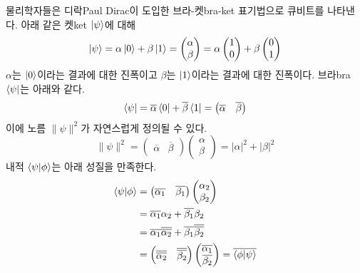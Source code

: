 \documentclass[a4paper,chapter,atbegshi]{oblivoir}
\begin{document}
물리학자들은 디락{\tiny Paul Dirac}이 도입한 브라-켓{\tiny bra-ket} 표기법으로
큐비트를 나타낸다. 아래 같은 켓{\tiny ket} $\ket{\psi}$에 대해
 \[
   \ket{\psi} = \alpha\ket0+\beta\ket1 = \begin{pmatrix}\alpha\\\beta\end{pmatrix}
  =\alpha\begin{pmatrix}1\\0\end{pmatrix}+\beta\begin{pmatrix}0\\1\end{pmatrix} 
 \]
$\alpha$는 $\ket{0}$이라는 결과에 대한 진폭이고 $\beta$는 $\ket{1}$이라는
결과에 대한 진폭이다. 브라{\tiny bra} $\bra{\psi}$는 아래와 같다.
 \[
   \bra{\psi} = \overline{\alpha}\bra0 +\overline{\beta}\bra1=
   \begin{pmatrix}\overline{\alpha}&\overline{\beta}\end{pmatrix}
 \]
 이에 노름 $\|\psi\|^2$가 자연스럽게 정의될 수 있다. 
 \[
   \|\psi\|^2 = \begin{pmatrix}\overline{\alpha}&\overline{\beta}\end{pmatrix}
   \begin{pmatrix}\alpha\\\beta\end{pmatrix}=|\alpha|^2+|\beta|^2
 \]
 내적 $\braket{\psi|\phi}$는 아래 성질을 만족한다.
 \begin{align*}
   \braket{\psi|\phi} &= 
   \begin{pmatrix}\overline{\alpha_1} &\overline{\beta_1}\end{pmatrix}
   \begin{pmatrix}\alpha_2\\\beta_2\end{pmatrix} \\
    &= \overline{\alpha_1}\alpha_2+\overline{\beta_1}\beta_2\\
    &=\overline{\alpha_1}\overline{\overline{\alpha_2}}+
    \overline{\beta_1}\overline{\overline{\beta_2}} \\
    &= \begin{pmatrix}\overline{\overline{\alpha_2}} & \overline{\overline{\beta_2}}\end{pmatrix}
   \begin{pmatrix}\overline{\alpha_1}\\\overline{\beta_2}\end{pmatrix}
   = \overline{\braket{\phi|\psi}}
 \end{align*}
\end{document}
